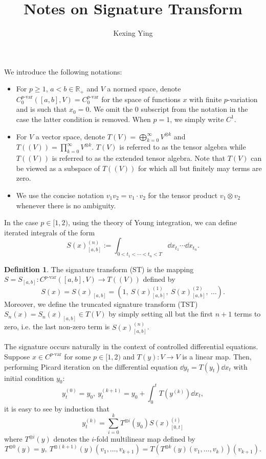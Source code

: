 \documentclass[]{article}
\theoremstyle{definition}
\theoremstyle{definition}
\newtheorem{definition}{Definition}
\newcommand{\pvar}{{p\text{-var}}}
\begin{document}
\title{Notes on Signature Transform}
\author{Kexing Ying}
\maketitle

We introduce the following notations:
\begin{itemize}
  \item For \(p \ge 1\), \(a < b \in \mathbb{R}_+\) and \(V\) a normed space, denote 
    \(C^\pvar_0([a, b], V)= C^\pvar_0\) for the space of functions \(x\) with finite \(p\)-variation 
    and is such that \(x_0 = 0\). We omit the \(0\) subscript from the notation in the case the 
    latter condition is removed. When \(p = 1\), we simply write \(C^1\).
  \item For \(V\) a vector space, denote \(T(V) = \bigoplus_{k = 0}^\infty V^{\otimes k}\) and 
    \(T((V)) = \prod_{k = 0}^\infty V^{\otimes k}\). \(T(V)\) is referred to as the tensor algebra 
    while \(T((V))\) is referred to as the extended tensor algebra. Note that \(T(V)\) can be viewed 
    as a subspace of \(T((V))\) for which all but finitely may terms are zero.
  \item We use the concise notation \(v_1v_2 = v_1 \cdot v_2\) for the tensor product \(v_1 \otimes v_2\) 
    whenever there is no ambiguity.
\end{itemize}

In the case \(p \in [1, 2)\), using the theory of Young integration, we can define iterated integrals 
of the form 
\[S(x)_{[a, b]}^{(n)} := \int_{0 < t_1 < \cdots < t_n < T} \dd x_{t_1} \cdots \dd x_{t_n}.\]
\begin{definition}
  The signature transform (ST) is the mapping \(S = S_{[a, b]} : C^\pvar([a, b], V) \to T((V))\) defined by
  \[S(x) = S(x)_{[a, b]} = \left(1,\ S(x)_{[a, b]}^{(1)},\ S(x)_{[a, b]}^{(2)},\ \dots\right).\]
  Moreover, we define the truncated signature transform (TST) \(S_n(x) = S_n(x)_{[a, b]} \in T(V)\) by 
  simply setting all but the first \(n + 1\) terms to zero, i.e. the last non-zero term is \(S(x)_{[a, b]}^{(n)}\).
\end{definition}

The signature occurs naturally in the context of controlled differential equations. Suppose \(x \in C^\pvar\)
for some \(p \in [1, 2)\) and \(T(y) : V \to V\) is a linear map. Then, performing Picard iteration on 
the differential equation \(\dd y_t = T(y_t) \dd x_t\) with initial condition \(y_0\):
\[y^{(0)}_t = y_0,\ y_t^{(k + 1)} = y_0 + \int_0^t T(y^{(k)}) \dd x_t,\]
it is easy to see by induction that 
\[y_t^{(k)} = \sum_{i = 0}^k T^{\otimes i}(y_0) S(x)^{(i)}_{[0, t]}\]
where \(T^{\otimes i}(y)\) denotes the \(i\)-fold multilinear map defined by 
\[T^{\otimes 0}(y) = y,\ T^{\otimes (k + 1)}(y)(v_1, \dots, v_{k + 1}) = T(T^{\otimes k}(y)(v_1, \dots, v_k))(v_{k + 1}).\]
\end{document}
